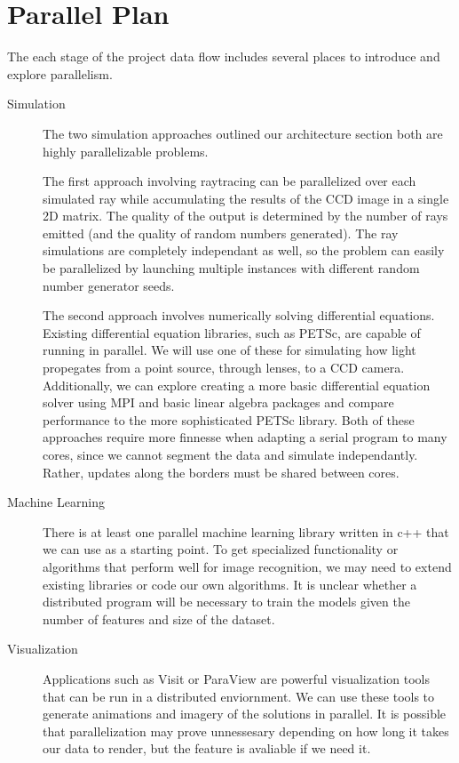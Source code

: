 \section{Parallel Plan}
The each stage of the project data flow includes several places to introduce and explore parallelism.

\begin{description}
\item[Simulation] The two simulation approaches outlined our architecture section both are highly parallelizable problems.

The first approach involving raytracing can be parallelized over each simulated ray while accumulating the results of the CCD image in a single 2D matrix. The quality of the output is determined by the number of rays emitted (and the quality of random numbers generated). The ray simulations are completely independant as well, so the problem can easily be parallelized by launching multiple instances with different random number generator seeds.

The second approach involves numerically solving differential equations. Existing differential equation libraries, such as PETSc, are capable of running in parallel. We will use one of these for simulating how light propegates from a point source, through lenses, to a CCD camera. Additionally, we can explore creating a more basic differential equation solver using MPI and basic linear algebra packages and compare performance to the more sophisticated PETSc library. Both of these approaches require more finnesse when adapting a serial program to many cores, since we cannot segment the data and simulate independantly. Rather, updates along the borders must be shared between cores.

\item[Machine Learning] There is at least one parallel machine learning library written in c++ that we can use as a starting point.  To get specialized functionality or algorithms that perform well for image recognition, we may need to extend existing libraries or code our own algorithms.  It is unclear whether a distributed program will be necessary to train the models given the number of features and size of the dataset.
\item[Visualization] Applications such as Visit or ParaView are powerful visualization tools that can be run in a distributed enviornment. We can use these tools to generate animations and imagery of the solutions in parallel. It is possible that parallelization may prove unnessesary depending on how long it takes our data to render, but the feature is avaliable if we need it.

\end{description}


